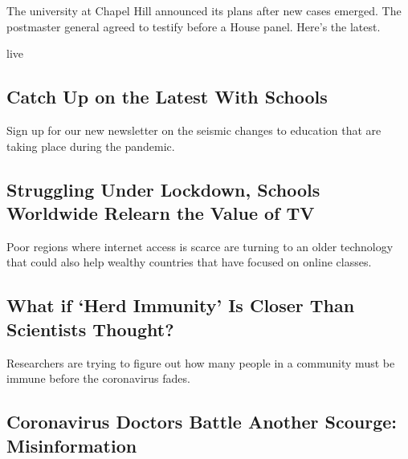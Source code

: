 The university at Chapel Hill announced its plans after new cases
emerged. The postmaster general agreed to testify before a House panel.
Here's the latest.

live

\href{/2020/08/17/us/k-12-schools-reopening.html}{}

\hypertarget{catch-up-on-the-latest-with-schools}{%
\subsection{Catch Up on the Latest With
Schools}\label{catch-up-on-the-latest-with-schools}}

Sign up for our new newsletter on the seismic changes to education that
are taking place during the pandemic.

\href{/2020/08/17/world/coronavirus-television-schools.html}{}

\hypertarget{struggling-under-lockdown-schools-worldwide-relearn-the-value-of-tv}{%
\subsection{Struggling Under Lockdown, Schools Worldwide Relearn the
Value of
TV}\label{struggling-under-lockdown-schools-worldwide-relearn-the-value-of-tv}}

Poor regions where internet access is scarce are turning to an older
technology that could also help wealthy countries that have focused on
online classes.

\href{/2020/08/17/health/coronavirus-herd-immunity.html}{}

\hypertarget{what-if-herd-immunity-is-closer-than-scientists-thought}{%
\subsection{What if `Herd Immunity' Is Closer Than Scientists
Thought?}\label{what-if-herd-immunity-is-closer-than-scientists-thought}}

Researchers are trying to figure out how many people in a community must
be immune before the coronavirus fades.

\href{/2020/08/17/technology/coronavirus-disinformation-doctors.html}{}

\hypertarget{coronavirus-doctors-battle-another-scourge-misinformation}{%
\subsection{Coronavirus Doctors Battle Another Scourge:
Misinformation}\label{coronavirus-doctors-battle-another-scourge-misinformation}}

